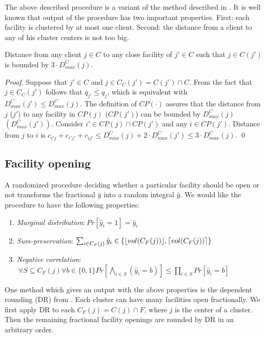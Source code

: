 \documentclass{llncs}
\DeclarePairedDelimiter{\ceil}{\lceil}{\rceil}
\DeclarePairedDelimiter{\floor}{\lfloor}{\rfloor}
\begin{document}
The above described procedure is a variant of the method described in \cite{Chudak}. It is well known that output of the procedure has two important properties. First: each facility is clustered by at most one client. Second: the distance from a client to any of his cluster centers is not too big.

\begin{lemma}
\label{3hop_bound}
Distance from any client $j \in C$ to any close facility of $j' \in C$ such that $j \in C(j')$ is bounded by $3 \cdot D_{max}^C(j)$.
\end{lemma}

\begin{proof}
Suppose that $j' \in C$ and $j \in C_{C}(j') = C(j') \cap C$. From the fact that $j \in C_{C}(j')$ follows that $q_{j'} \leq q_{j}$, which is equivalent with $D_{max}^C(j') \leq D_{max}^C(j)$. The definition of $CP(\cdot)$ assures that the distance from $j$ ($j'$) to any facility in $CP(j)$ ($CP(j')$) can be bounded by $D_{max}^C(j)$ $(D_{max}^C(j'))$. Consider $i' \in CP(j) \cap CP(j')$ and any $i \in CP(j')$. Distance from $j$ to $i$ is $c_{i'j} + c_{i'j'} + c_{ij'} \leq D_{max}^C(j) + 2 \cdot D_{max}^C(j') \leq 3 \cdot D_{max}^C(j)$.
\qed
\end{proof}

\subsection{Facility opening}

A randomized procedure deciding whether a particular facility should be open or not transforms the fractional $\bar{y}$ into a random integral $\hat{y}$. 
We would like the procedure to have the following properties: 
\begin{enumerate}
 \item \emph{Marginal distribution}:$~Pr[\hat{y}_i = 1] = \bar{y}_i$
 \item \emph{Sum-preservation}:$~\sum_{i \in C_F(j)} \hat{y}_i \in \{\floor{vol(C_F(j))}, \ceil{vol(C_F(j))}\}$
 \item \emph{Negative correlation}:$~\displaystyle \forall S \subseteq C_F(j) \forall b \in \{0, 1\} Pr[\bigwedge_{i \in S}(\hat{y}_i = b)] \leq \prod_{i \in S} Pr[\hat{y}_i = b]$
\end{enumerate}

One method which gives an output with the above properties is the dependent rounding (DR) from \cite{Aravind}. 
Each cluster can have many facilities open fractionally. We first apply DR to each $C_F(j) = C(j) \cap F$, where $j$ is the center of a cluster. 
Then the remaining fractional facility openings are rounded by DR in an arbitrary order.
\end{document}
